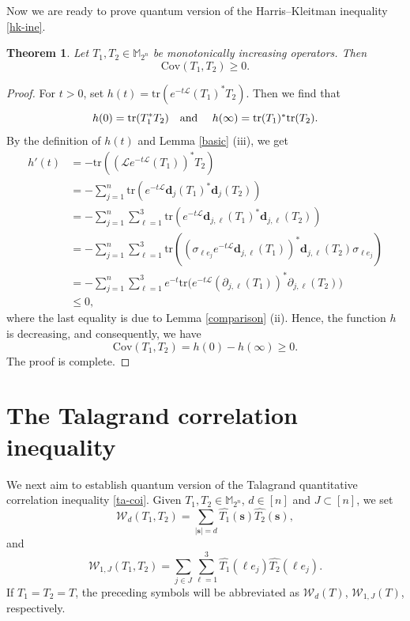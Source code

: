 \documentclass{amsbook}
\newtheorem{theorem}{Theorem}[chapter]
\theoremstyle{definition}
\theoremstyle{remark}
\numberwithin{section}{chapter}
\numberwithin{equation}{chapter}
\newcommand{\1}{\mathbf{1}}
\newcommand{\s}{\mathbf{s}}
\newcommand{\dc}{\mathbf{d}}
\begin{document}
Now we are ready to prove quantum version of the Harris--Kleitman inequality \eqref{hk-ine}.

\begin{theorem}\label{cov-0}  
Let $T_1,T_2\in\mathbb{M}_{2^n}$ be monotonically increasing operators. Then
	$$\mathrm{Cov}(T_1,T_2)\geq0.$$
\end{theorem}
\begin{proof} 
For $t>0$, set $h(t)=\mathrm{tr}(e^{-t\mathcal{L}}(T_1)^*T_2)$. Then we find that
	$$h(0)=\mathrm{tr}(T_1^*T_2)\quad \mbox{and \quad $h(\infty)=\mathrm{tr}(T_1)^*\mathrm{tr}(T_2)$}.$$
By the definition of $h(t)$ and Lemma \ref{basic} (iii), we get
\begin{align*}
h'(t)&=-\mathrm{tr}((\mathcal{L}e^{-t\mathcal{L}}(T_1))^*T_2)\\
&=-\sum_{j=1}^n\mathrm{tr}(e^{-t\mathcal{L}}\dc_j(T_1)^*\dc_j(T_2))\\
&=-\sum_{j=1}^n\sum_{\ell=1}^3\mathrm{tr}(e^{-t\mathcal{L}}\dc_{j,\ell}(T_1)^*\dc_{j,\ell}(T_2))\\
&=-\sum_{j=1}^n\sum_{\ell=1}^3\mathrm{tr}((\sigma_{\ell e_j}e^{-t\mathcal{L}}\dc_{j,\ell}(T_1))^*\dc_{j,\ell}(T_2)\sigma_{\ell e_j})\\
&=-\sum_{j=1}^n\sum_{\ell=1}^3e^{-t}\mathrm{tr}\Big(e^{-t\mathcal{L}}(\partial_{j,\ell}(T_1))^* \partial_{j,\ell}(T_2)\Big)\\
&\leq 0,
\end{align*}
where the last equality is due to Lemma \ref{comparison} (ii).
Hence, the function $h$ is decreasing, and consequently, we have
$$\mathrm{Cov}(T_1,T_2)=h(0)-h(\infty)\geq0.$$
The proof is complete.
\end{proof}


\section{The Talagrand correlation inequality}
We next aim to establish quantum version of the Talagrand quantitative correlation inequality \eqref{ta-coi}. 
Given $T_1,T_2\in\mathbb{M}_{2^n}$, $d\in [n]$ and $J\subset[n]$, we set $$\mathcal{W}_d(T_1,T_2)=\sum_{|\s|=d}\widehat{T_1}(\s)\widehat{T_2}(\s),$$
and
$$\mathcal{W}_{1,J}(T_1,T_2)=\sum_{j\in J}\sum_{\ell=1}^3\widehat{T_1}(\ell e_j)\widehat{T_2}(\ell e_j).$$
If  $T_1=T_2=T$, the preceding symbols will be abbreviated as $\mathcal{W}_d(T)$, $\mathcal{W}_{1,J}(T)$,  respectively.
\end{document}
